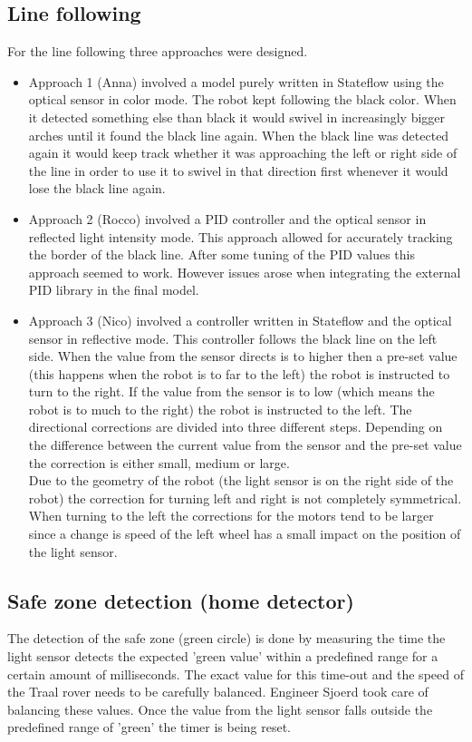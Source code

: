 \documentclass[a4paper,12pt]{article}
\begin{document}
\subsection{Line following}
For the line following three approaches were designed. 
\begin{itemize}
    \item Approach 1 (Anna) involved a model purely written in Stateflow using the optical sensor in color mode. The robot kept following the black color. When it detected something else than black it would swivel in increasingly bigger arches until it found the black line again. When the black line was detected again it would keep track whether it was approaching the left or right side of the line in order to use it to swivel in that direction first whenever it would lose the black line again.
    \item Approach 2 (Rocco) involved a PID controller and the optical sensor in reflected light intensity mode. This approach allowed for accurately tracking the border of the black line. After some tuning of the PID values this approach seemed to work. However issues arose when integrating the external PID library in the final model.
    \item Approach 3 (Nico) involved a controller written in Stateflow and the optical sensor in reflective mode. This controller follows the black line on the left side. When the value from the sensor directs is to higher then a pre-set value (this happens when the robot is to far to the left) the robot is instructed to turn to the right. If the value from the sensor is to low (which means the robot is to much to the right) the robot is instructed to the left. The directional corrections are divided into three different steps. Depending on the difference between the current value from the sensor and the pre-set value the correction is either small, medium or large.\\
    Due to the geometry of the robot (the light sensor is on the right side of the robot) the correction for turning left and right is not completely symmetrical. When turning to the left the corrections for the motors tend to be larger since a change is speed of the left wheel has a small impact on the position of the light sensor.
\end{itemize}
\subsection{Safe zone detection (home detector)}
The detection of the safe zone (green circle) is done by measuring the time the light sensor detects the expected 'green value' within a predefined range for a certain amount of milliseconds. The exact value for this time-out and the speed of the Traal rover needs to be carefully balanced. Engineer Sjoerd took care of balancing these values. Once the value from the light sensor falls outside the predefined range of 'green' the timer is being reset.
\end{document}
